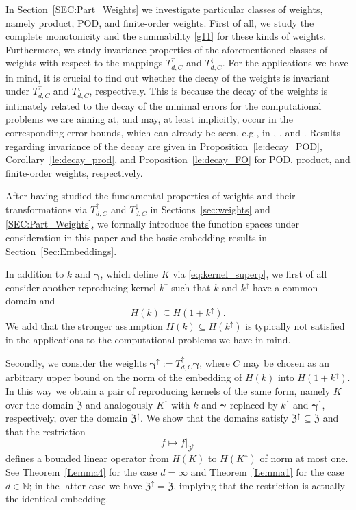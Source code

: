 \documentclass{article}
\newcommand{\N}  {{\mathbb N}}
\newcommand{\bg}{{\boldsymbol{\gamma}}}
\newcommand{\Z}{{\mathfrak Z}}
\newcommand{\lo}{\downarrow}
\newcommand{\up}{\uparrow}
\theoremstyle{plain}
\theoremstyle{definition}
\begin{document}
In Section~\ref{SEC:Part_Weights} we investigate
particular classes of weights, namely product, POD, and 
finite-order weights. First of all, we study the complete 
monotonicity and the summability \eqref{g11} for these kinds of 
weights. Furthermore, we study invariance properties of the 
aforementioned classes of weights with respect to the mappings 
$T^\up_{d, C}$ and $T^\lo_{d, C}$. For the
applications we have in mind, it is crucial to find out whether 
the decay of the weights is invariant under $T_{d, C}^\up$ and 
$T^\lo_{d, C}$, respectively. 
This is because the decay of the weights is intimately related to 
the decay of the minimal errors for the 
computational problems we are aiming at,
and may, 
at least implicitly, occur in the corresponding error bounds, 
which can already be seen, e.g., in \citet{HMNR10},
\citet{KSWW10a}, and \citet{PW11}. Results regarding invariance 
of the decay are given in 
Proposition~\ref{le:decay_POD}, Corollary~\ref{le:decay_prod}, and
Proposition~\ref{le:decay_FO} for POD, product, and finite-order
weights, respectively. 

After having studied the fundamental properties of weights and their 
transformations via $T^\up_{d, C}$ and $T^\lo_{d, C}$
in Sections~\ref{sec:weights} and \ref{SEC:Part_Weights}, 
we formally introduce the function spaces under consideration in 
this paper and the basic embedding results
in Section~\ref{Sec:Embeddings}.

In addition to $k$ and $\bg$, which define $K$ via
\eqref{eq:kernel_superp},
we first of all consider another reproducing kernel
$k^\up$ such that $k$ and $k^\up$ have a common 
domain and
\[
H(k) \subseteq H(1+k^\up).
\]
We add that the stronger assumption
$H(k) \subseteq H(k^\up)$ is typically not satisfied in the 
applications to the computational problems we have
in mind.

Secondly, we consider the weights $\bg^\up :=  
T^\up_{d, C} \bg$, where $C$  may be 
chosen as an arbitrary upper bound on the norm of the embedding of 
$H(k)$ into $H(1+k^\up)$. 
In this way we obtain a pair of reproducing kernels of the 
same form, namely $K$ over the domain $\Z$ and 
analogously $K^\up$ with $k$ 
and $\bg$ replaced by $k^\up$ and $\bg^\up$, respectively, over the
domain $\Z^\up$. We show that the domains
satisfy $\Z^\up \subseteq \Z$ and that
the restriction
\[
f \mapsto f|_{\Z^\up}
\]
defines a bounded linear operator from 
$H(K)$ to $H(K^\up)$ of
norm at most one.
See Theorem~\ref{Lemma4} for the case $d= \infty$ and
Theorem~\ref{Lemma1} for the case $d \in \N$; 
in the latter case we have $\Z^\up = \Z$, implying that
the restriction is actually the identical embedding.
\end{document}

